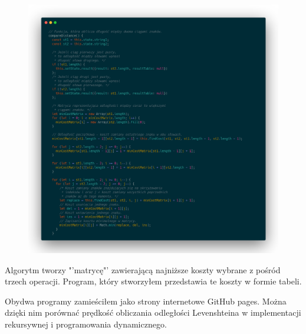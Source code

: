 \documentclass[a4paper,12pt]{article}
\begin{document}
\begin{figure}[H]
    \includegraphics[scale=0.17]{dynamic.png}
\end{figure}

Algorytm tworzy "'matrycę"' zawierającą najniższe koszty wybrane
z pośród trzech operacji. Program, który stworzyłem przedstawia
te koszty w formie tabeli.

Obydwa programy zamieściłem jako strony internetowe GitHub pages.
Można dzięki nim porównać prędkość obliczania odległości Levenshteina
w implementacji rekursywnej i programowania dynamicznego.



\end{document}
